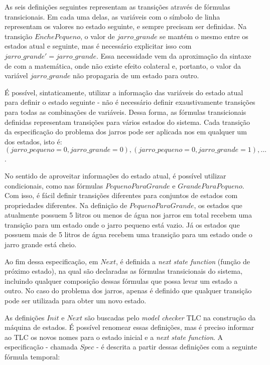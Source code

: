 As seis definições seguintes representam as transições através de fórmulas transicionais. Em cada uma delas, as variáveis com o símbolo de linha representam os valores no estado seguinte, e sempre precisam ser definidas. Na transição $EnchePequeno$, o valor de $jarro\_grande$ se mantém o mesmo entre os estados atual e seguinte, mas é necessário explicitar isso com $jarro\_grande' = jarro\_grande$. Essa necessidade vem da aproximação da sintaxe de \TLA com a matemática, onde não existe efeito colateral e, portanto, o valor da variável $jarro\_grande$ não propagaria de um estado para outro.

É possível, sintaticamente, utilizar a informação das variáveis do estado atual para definir o estado seguinte - não é necessário definir exaustivamente transições para todas as combinações de variáveis. Dessa forma, as fórmulas transicionais definidas representam transições para vários estados do sistema. Cada transição da especificação do problema dos jarros pode ser aplicada nos em qualquer um dos estados, isto é: $(jarro\_pequeno = 0, jarro\_grande = 0), (jarro\_pequeno = 0, jarro\_grande = 1), \dots$.

No sentido de aproveitar informações do estado atual, é possível utilizar condicionais, como nas fórmulas $PequenoParaGrande$ e $GrandeParaPequeno$. Com isso, é fácil definir transições diferentes para conjuntos de estados com propriedades diferentes. Na definição de $PequenoParaGrande$, os estados que atualmente possuem 5 litros ou menos de água nos jarros em total recebem uma transição para um estado onde o jarro pequeno está vazio. Já os estados que possuem mais de 5 litros de água recebem uma transição para um estado onde o jarro grande está cheio.

Ao fim dessa especificação, em $Next$, é definida a \textit{next state function} (função de próximo estado), na qual são declaradas as fórmulas transicionais do sistema, incluindo qualquer composição dessas fórmulas que possa levar um estado a outro. No caso do problema dos jarros, apenas é definido que qualquer transição pode ser utilizada para obter um novo estado.

As definições $Init$ e $Next$ são buscadas pelo \textit{model checker} TLC na construção da máquina de estados. É possível renomear essas definições, mas é preciso informar ao TLC os novos nomes para o estado inicial e a \textit{next state function}. A especificação - chamada $Spec$ - é descrita a partir dessas definições com a seguinte fórmula  temporal:

